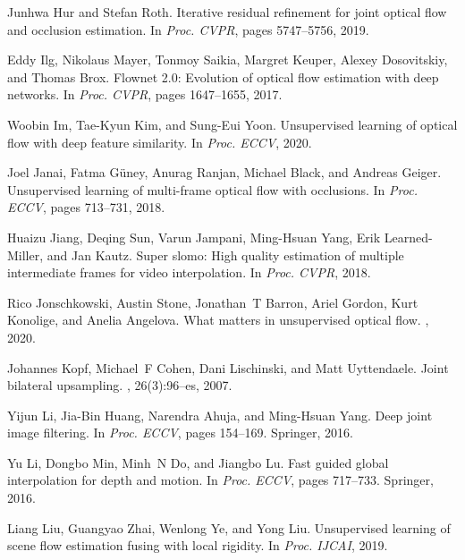 \documentclass[final]{cvpr}
\begin{document}
\begin{thebibliography}{10}
	Junhwa Hur and Stefan Roth.
	\newblock Iterative residual refinement for joint optical flow and occlusion
	estimation.
	\newblock In {\em {Proc. CVPR}}, pages 5747--5756, 2019.
	
	Eddy Ilg, Nikolaus Mayer, Tonmoy Saikia, Margret Keuper, Alexey Dosovitskiy,
	and Thomas Brox.
	\newblock Flownet 2.0: Evolution of optical flow estimation with deep networks.
	\newblock In {\em {Proc. CVPR}}, pages 1647--1655, 2017.
	
	Woobin Im, Tae-Kyun Kim, and Sung-Eui Yoon.
	\newblock Unsupervised learning of optical flow with deep feature similarity.
	\newblock In {\em {Proc. ECCV}}, 2020.
	
	Joel Janai, Fatma Güney, Anurag Ranjan, Michael Black, and Andreas Geiger.
	\newblock Unsupervised learning of multi-frame optical flow with occlusions.
	\newblock In {\em {Proc. ECCV}}, pages 713--731, 2018.
	
	Huaizu Jiang, Deqing Sun, Varun Jampani, Ming-Hsuan Yang, Erik Learned-Miller,
	and Jan Kautz.
	\newblock Super slomo: High quality estimation of multiple intermediate frames
	for video interpolation.
	\newblock In {\em {Proc. CVPR}}, 2018.
	
	Rico Jonschkowski, Austin Stone, Jonathan~T Barron, Ariel Gordon, Kurt
	Konolige, and Anelia Angelova.
	\newblock What matters in unsupervised optical flow.
	, 2020.
	
	Johannes Kopf, Michael~F Cohen, Dani Lischinski, and Matt Uyttendaele.
	\newblock Joint bilateral upsampling.
	, 26(3):96--es, 2007.
	
	Yijun Li, Jia-Bin Huang, Narendra Ahuja, and Ming-Hsuan Yang.
	\newblock Deep joint image filtering.
	\newblock In {\em {Proc. ECCV}}, pages 154--169. Springer, 2016.
	
	Yu Li, Dongbo Min, Minh~N Do, and Jiangbo Lu.
	\newblock Fast guided global interpolation for depth and motion.
	\newblock In {\em {Proc. ECCV}}, pages 717--733. Springer, 2016.
	
	Liang Liu, Guangyao Zhai, Wenlong Ye, and Yong Liu.
	\newblock Unsupervised learning of scene flow estimation fusing with local
	rigidity.
	\newblock In {\em {Proc. IJCAI}}, 2019.
	

\end{thebibliography}
\end{document}

